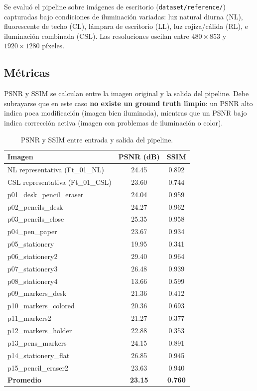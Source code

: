 \documentclass[11pt,a4paper]{article}
\begin{document}
Se evaluó el pipeline sobre imágenes de escritorio (\texttt{dataset/reference/})
capturadas bajo condiciones de iluminación variadas: luz natural diurna (NL),
fluorescente de techo (CL), lámpara de escritorio (LL), luz rojiza/cálida (RL),
e iluminación combinada (CSL). Las resoluciones oscilan entre
\(480 \times 853\) y \(1920 \times 1280\) píxeles.

\subsection{Métricas}

PSNR y SSIM se calculan entre la imagen original y la salida del pipeline.
Debe subrayarse que en este caso \textbf{no existe un ground truth limpio}: un
PSNR alto indica poca modificación (imagen bien iluminada), mientras que un
PSNR bajo indica corrección activa (imagen con problemas de iluminación o color).

\begin{table}[H]
\centering
\caption{PSNR y SSIM entre entrada y salida del pipeline.}
\label{tab:metricas}
\begin{tabular}{@{}lcc@{}}
\toprule
Imagen & PSNR (dB) & SSIM \\
\midrule
NL representativa (Ft\_01\_NL) & 24.45 & 0.892 \\
CSL representativa (Ft\_01\_CSL) & 23.60 & 0.744 \\
\midrule
p01\_desk\_pencil\_eraser & 24.04 & 0.959 \\
p02\_pencils\_desk        & 24.27 & 0.962 \\
p03\_pencils\_close       & 25.35 & 0.958 \\
p04\_pen\_paper           & 23.67 & 0.934 \\
p05\_stationery           & 19.95 & 0.341 \\
p06\_stationery2          & 29.40 & 0.964 \\
p07\_stationery3          & 26.48 & 0.939 \\
p08\_stationery4          & 13.66 & 0.599 \\
p09\_markers\_desk        & 21.36 & 0.412 \\
p10\_markers\_colored     & 20.36 & 0.693 \\
p11\_markers2             & 21.27 & 0.377 \\
p12\_markers\_holder      & 22.88 & 0.353 \\
p13\_pens\_markers        & 24.15 & 0.891 \\
p14\_stationery\_flat     & 26.85 & 0.945 \\
p15\_pencil\_eraser2      & 23.63 & 0.940 \\
\midrule
\textbf{Promedio} & \textbf{23.15} & \textbf{0.760} \\
\bottomrule
\end{tabular}
\end{table}
\end{document}
